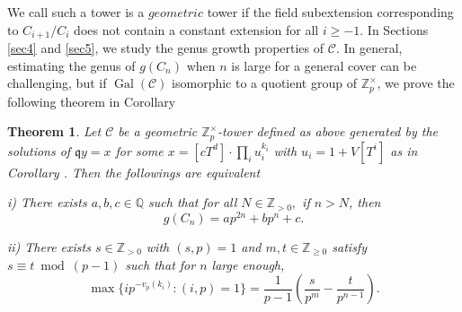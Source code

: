 \documentclass{proc-l}
\newtheorem{theorem}{Theorem}[section]
\theoremstyle{definition}
\theoremstyle{remark}
\numberwithin{equation}{section}
\DeclareMathOperator{\Gal}{Gal}
\begin{document}
{We call such a tower is a $geometric$ tower if the field subextension corresponding to $C_{i+1}/C_i$ does not contain a constant extension for all $i\geq-1$. In Sections \ref{sec4} and \ref{sec5}, we study the genus growth properties of $\mathscr C$. In general, estimating the genus of $g(C_n)$ when $n$ is large  for a general cover can be challenging, but if $\Gal(\mathcal C)$ isomorphic to a quotient group of $\mathbb Z_p^\times$, we prove the following theorem in Corollary \boxed{\ref{4.18}}
\begin{theorem}\label{1.5}
    Let $\mathcal C$ be a geometric $\mathbb Z_p^\times$-tower defined as above generated by the solutions of $\mathfrak qy=x$ for some $x=[cT^d]\cdot\prod_iu_i^{k_i}$ with $u_i=1+V[T^i]$ as in Corollary \boxed{\ref{3.8}}. Then the followings are equivalent
    
    i) There exists $a,b,c\in\mathbb Q$ such that for all $N\in\mathbb Z_{>0},$ if $n>N$, then $$g(C_n)=ap^{2n}+bp^n+c.$$
    
    ii) There exists $s\in\mathbb Z_{>0}$ with $(s,p)=1$ and $m,t\in\mathbb Z_{\geq0}$ satisfy $s\equiv t\bmod (p-1)$ such that for $n$ large enough, $$\max\{ip^{-v_p(k_i)}:(i,p)=1\}=\frac{1}{p-1}(\frac{s}{p^m}-\frac{t}{p^{n-1}}).$$
\end{theorem}






}
\end{document}
